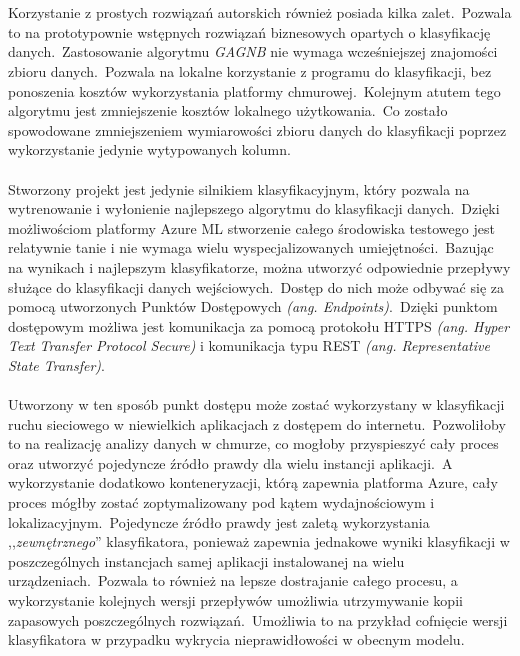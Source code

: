 \\ \\
Korzystanie z prostych rozwiązań autorskich również posiada kilka zalet.\ Pozwala to na prototypownie wstępnych rozwiązań biznesowych opartych o klasyfikację danych.\ Zastosowanie algorytmu \textit{GAGNB} nie wymaga wcześniejszej znajomości zbioru danych.\ Pozwala na lokalne korzystanie z programu do klasyfikacji, bez ponoszenia kosztów wykorzystania platformy chmurowej.\ Kolejnym atutem tego algorytmu jest zmniejszenie kosztów lokalnego użytkowania.\ Co zostało spowodowane zmniejszeniem wymiarowości zbioru danych do klasyfikacji poprzez wykorzystanie jedynie wytypowanych kolumn.
\\ \\
Stworzony projekt jest jedynie silnikiem klasyfikacyjnym, który pozwala na wytrenowanie i wyłonienie najlepszego algorytmu do klasyfikacji danych.\ Dzięki możliwościom platformy Azure ML stworzenie całego środowiska testowego jest relatywnie tanie i nie wymaga wielu wyspecjalizowanych umiejętności.\ Bazując na wynikach i najlepszym klasyfikatorze, można utworzyć odpowiednie przepływy służące do klasyfikacji danych wejściowych.\ Dostęp do nich może odbywać się za pomocą utworzonych Punktów Dostępowych \textit{(ang. Endpoints)}.\ Dzięki punktom dostępowym możliwa jest komunikacja za pomocą protokołu HTTPS \textit{(ang. Hyper Text Transfer Protocol Secure)} i komunikacja typu REST \textit{(ang. Representative State Transfer)}.
\\ \\
Utworzony w ten sposób punkt dostępu może zostać wykorzystany w klasyfikacji ruchu sieciowego w niewielkich aplikacjach z dostępem do internetu.\ Pozwoliłoby to na realizację analizy danych w chmurze, co mogłoby przyspieszyć cały proces oraz utworzyć pojedyncze źródło prawdy dla wielu instancji aplikacji.\ A wykorzystanie dodatkowo konteneryzacji, którą zapewnia platforma Azure, cały proces mógłby zostać zoptymalizowany pod kątem wydajnościowym i lokalizacyjnym.\ Pojedyncze źródło prawdy jest zaletą wykorzystania ,,\textit{zewnętrznego}'' klasyfikatora, ponieważ zapewnia jednakowe wyniki klasyfikacji w poszczególnych instancjach samej aplikacji instalowanej na wielu urządzeniach.\ Pozwala to również na lepsze dostrajanie całego procesu, a wykorzystanie kolejnych wersji przepływów umożliwia utrzymywanie kopii zapasowych poszczególnych rozwiązań.\ Umożliwia to na przykład cofnięcie wersji klasyfikatora w przypadku wykrycia nieprawidłowości w obecnym modelu.
